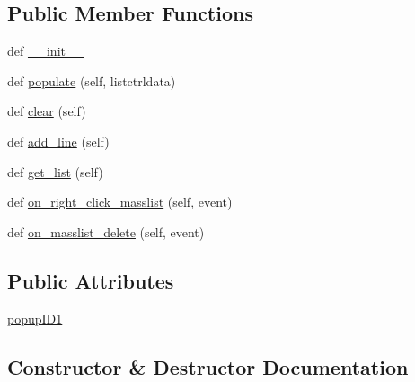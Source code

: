 \subsection*{Public Member Functions}
\begin{DoxyCompactItemize}
\item 
def \hyperlink{class_uni_dec_1_1unidec__modules_1_1masstools_1_1_mass_list_crtl_acdd7aebe3ad137ea5f99ba01414ea9ee}{\+\_\+\+\_\+init\+\_\+\+\_\+}
\item 
def \hyperlink{class_uni_dec_1_1unidec__modules_1_1masstools_1_1_mass_list_crtl_a4f8b685c115dca7acb1faf194ddc75cc}{populate} (self, listctrldata)
\item 
def \hyperlink{class_uni_dec_1_1unidec__modules_1_1masstools_1_1_mass_list_crtl_a5ee76755bbeae0c66eef7c37f714296f}{clear} (self)
\item 
def \hyperlink{class_uni_dec_1_1unidec__modules_1_1masstools_1_1_mass_list_crtl_ac78656ae5220e3e2432471d4f0786613}{add\+\_\+line} (self)
\item 
def \hyperlink{class_uni_dec_1_1unidec__modules_1_1masstools_1_1_mass_list_crtl_a2006feaf93eaea405afd403864580227}{get\+\_\+list} (self)
\item 
def \hyperlink{class_uni_dec_1_1unidec__modules_1_1masstools_1_1_mass_list_crtl_ad39122ae9b869b1c948f647610fc60c7}{on\+\_\+right\+\_\+click\+\_\+masslist} (self, event)
\item 
def \hyperlink{class_uni_dec_1_1unidec__modules_1_1masstools_1_1_mass_list_crtl_a5c8ae849b0f23fda7bdd1ddde44ec716}{on\+\_\+masslist\+\_\+delete} (self, event)
\end{DoxyCompactItemize}
\subsection*{Public Attributes}
\begin{DoxyCompactItemize}
\item 
\hyperlink{class_uni_dec_1_1unidec__modules_1_1masstools_1_1_mass_list_crtl_a824de3351a3b5816b768200776563a44}{popup\+I\+D1}
\end{DoxyCompactItemize}


\subsection{Constructor \& Destructor Documentation}
\hypertarget{class_uni_dec_1_1unidec__modules_1_1masstools_1_1_mass_list_crtl_acdd7aebe3ad137ea5f99ba01414ea9ee}{}
